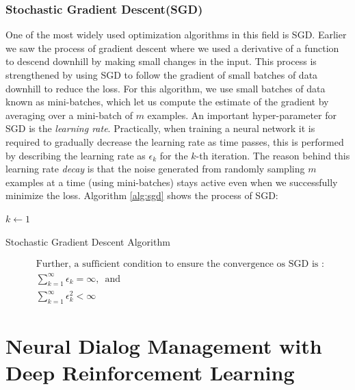\documentclass[14pt]{extarticle}
\numberwithin{equation}{section}
\begin{document}
	\subsubsection{Stochastic Gradient Descent(SGD)}\label{sgd}
	One of the most widely used optimization algorithms in this field is SGD. Earlier we saw the process of gradient descent where we used a derivative of a function to descend downhill by making small changes in the input. This process is strengthened by using SGD to follow the gradient of small batches of data downhill to reduce the loss. For this algorithm, we use small batches of data known as mini-batches, which let us compute the estimate of the gradient by averaging over a mini-batch of $m$ examples. An important hyper-parameter for SGD is the \textit{learning rate}. Practically, when training a neural network it is required to gradually decrease the learning rate as time passes, this is performed by describing the learning rate as $\epsilon_k$ for the $k$-th iteration. The reason behind this learning rate \textit{decay} is that the noise generated from randomly sampling $m$ examples at a time (using mini-batches) stays active even when we successfully minimize the loss. Algorithm \ref{alg:sgd} shows the process of SGD: 
	\begin{algorithm}[t]
		\DontPrintSemicolon
		\SetAlgoLined
		$k \gets 1$\;
		\caption{Stochastic Gradient Descent Algorithm}\label{alg:sgd}
	\end{algorithm}
	
	\begin{align}
	&\text{Further, a sufficient condition to ensure the convergence os SGD is : }\nonumber\\
	&\sum_{k=1}^{\infty}\epsilon_k = \infty \text{,     {}{}    and}\\
	&\sum_{k=1}^{\infty}\epsilon_k^2 < \infty
	\end{align}
	\pagebreak
	
	\section[Neural Dialog Management]{Neural Dialog Management  with Deep Reinforcement Learning}\label{dm-with-drl}
\end{document}
